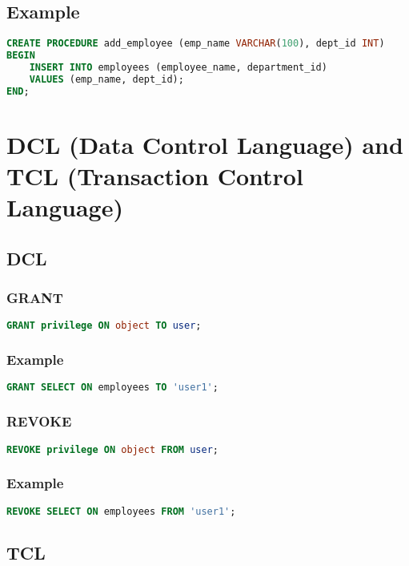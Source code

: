 \documentclass{article}
\begin{document}
\subsection{Example}
\begin{lstlisting}[language=SQL]
CREATE PROCEDURE add_employee (emp_name VARCHAR(100), dept_id INT)
BEGIN
    INSERT INTO employees (employee_name, department_id)
    VALUES (emp_name, dept_id);
END;
\end{lstlisting}

\newpage
\section{DCL (Data Control Language) and TCL (Transaction Control Language)}

\subsection{DCL}

\subsubsection{GRANT}
\begin{lstlisting}[language=SQL]
GRANT privilege ON object TO user;
\end{lstlisting}

\subsubsection{Example}
\begin{lstlisting}[language=SQL]
GRANT SELECT ON employees TO 'user1';
\end{lstlisting}

\subsubsection{REVOKE}
\begin{lstlisting}[language=SQL]
REVOKE privilege ON object FROM user;
\end{lstlisting}

\subsubsection{Example}
\begin{lstlisting}[language=SQL]
REVOKE SELECT ON employees FROM 'user1';
\end{lstlisting}

\subsection{TCL}
\end{document}
